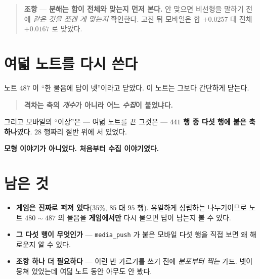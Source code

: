 \documentclass[11pt]{article}
\begin{document}
\begin{quote}
\textbf{조항} --- \textbf{분해는 합이 전체와 맞는지 먼저 본다.} 안 맞으면
비선형을 말하기 전에 \emph{같은 것을 쪼갠 게 맞는지} 확인한다. 고친 뒤
모바일은 합 $+0.0257$ 대 전체 $+0.0167$ 로 맞았다.
\end{quote}

\section{여덟 노트를 다시 쓴다}

노트 487 이 ``한 물음에 답이 넷''이라고 닫았다. 이 노트는 그보다
간단하게 닫는다.

\begin{quote}
\textbf{격차는 축의 \emph{개수}가 아니라 어느 \emph{수집}이 붙었냐다.}
\end{quote}

그리고 모바일의 ``이상''은 --- 여덟 노트를 끈 그것은 --- \textbf{$441$ 행
중 다섯 행에 붙은 축 하나}였다. $28$ 행짜리 절반 위에 서 있었다.

\textbf{모형 이야기가 아니었다. 처음부터 수집 이야기였다.}

\section*{남은 것}

\begin{itemize}
\item \textbf{게임은 진짜로 퍼져 있다}($35\%$, $85$ 대 $95$ 행). 유일하게
성립하는 나누기이므로 노트 $480 \sim 487$ 의 물음을 \textbf{게임에서만}
다시 물으면 답이 남는지 볼 수 있다.
\item \textbf{그 다섯 행이 무엇인가} --- \texttt{media\_push} 가 붙은
모바일 다섯 행을 직접 보면 왜 해로운지 알 수 있다.
\item \textbf{조항 하나 더 필요하다} --- 이런 반 가르기를 쓰기 전에
\emph{분포부터 찍는} 가드. 넷이 뭉쳐 있었는데 여덟 노트 동안 아무도 안
봤다.
\end{itemize}
\end{document}
